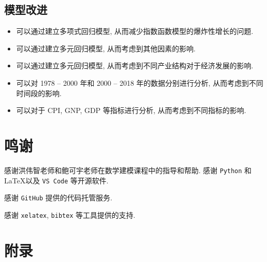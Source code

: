 \documentclass{article}
\begin{document}
\subsection{模型改进}

\begin{itemize}
  \item 可以通过建立多项式回归模型, 从而减少指数函数模型的爆炸性增长的问题.
  \item 可以通过建立多元回归模型, 从而考虑到其他因素的影响.
  \item 可以通过建立多元回归模型, 从而考虑到不同产业结构对于经济发展的影响.
  \item 可以对 1978 -- 2000 年和 2000 -- 2018 年的数据分别进行分析, 从而考虑到不同时间段的影响.
  \item 可以对于 CPI, GNP, GDP 等指标进行分析, 从而考虑到不同指标的影响.
\end{itemize}

\section*{鸣谢}

\par 感谢洪伟智老师和鲍可宇老师在数学建模课程中的指导和帮助. 感谢 \texttt{Python} 和 \LaTeX 以及 \texttt{VS Code} 等开源软件.\\
\par 感谢 \texttt{GitHub} 提供的代码托管服务.\\
\par 感谢 \texttt{xelatex}, \texttt{bibtex} 等工具提供的支持.\\

{}


\nocite{*}

\section*{附录}
\end{document}

